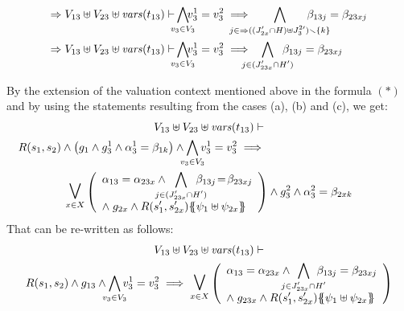 \documentclass[runningheads]{llncs}
\begin{document}
\begin{enumerate}
\begin{enumerate}
\begin{align*}
\Rightarrow  V_{13} \uplus V_{23}  \uplus \fvars{t_{13}}\vdash & \bigwedge_\subbox{v_3\in V_3}\!\! v^1_3=v^2_3\implies {\displaystyle \bigwedge_\subbox{j \in \Rightarrow   ((J'_{2x}   \cap H)\uplus J^{2 \prime}_3)\setminus \{k\} } \beta_{13j} = \beta_{23xj}} \\
\Rightarrow    V_{13} \uplus V_{23}  \uplus \fvars{t_{13}}\vdash & \bigwedge_\subbox{v_3\in V_3}\!\! v^1_3=v^2_3\implies {\displaystyle \bigwedge_\subbox{j \in (J'_{23x}   \cap H') } \beta_{13j} = \beta_{23xj}}
\end{align*}
\end{enumerate}


By the extension of the valuation context mentioned above in the formula $(*)$ and by using the statements resulting from the cases (a), (b) and (c), we get:
\begin{multline*}
V_{13} \uplus V_{23}  \uplus \fvars{t_{13}} \vdash\\
R\mpar{s_1, s_{2}} \wedge \mpar{g_1 \wedge g^1_3 \wedge \alpha^1_3=\beta_{1k}}\wedge \bigwedge_\subbox{v_3\in V_3}  v^1_3=v^2_3 %
\implies  \hspace{12em}\\
\operatorname*{\bigsymb{\bigvee}}_{x \in X} \mpar{\everymath{\displaystyle}
\begin{array}{l}
			\alpha_{13} = \alpha_{23x} \wedge \bigwedge_\subbox{j \in (J'_{23x} \cap H')} \beta_{13j}\! =\! \beta_{23xj}\\
			 \nwedge g_{2x} \wedge R\mpar{s'_1, s'_{2x}}\psubst{\psi_1 \uplus \psi_{2x}}
		\end{array}}  \wedge g^2_3 \wedge \alpha^2_3=\beta_{2xk} 
\end{multline*}	
That can be re-written as follows:
\begin{multline*}
V_{13} \uplus V_{23} \uplus \fvars{t_{13}}  \vdash\\
R\mpar{s_1, s_{2}} \wedge g_{13}  \land \bigwedge_\subbox{v_3\in V_3} v^1_3=v^2_3
\implies  \operatorname*{\bigsymb{\bigvee}}_{x \in X} \mpar{\everymath{\displaystyle}
\begin{array}{l}
			\alpha_{13} = \alpha_{23x} \wedge \bigwedge_\subbox{j \in J'_{23x} \cap H'} \beta_{13j} = \beta_{23xj} \\
			\nwedge g_{23x} \wedge R\mpar{s'_1, s'_{2x}}\psubst{\psi_1 \uplus \psi_{2x}}
		\end{array}}   
\end{multline*}	


\end{enumerate}
\end{document}
